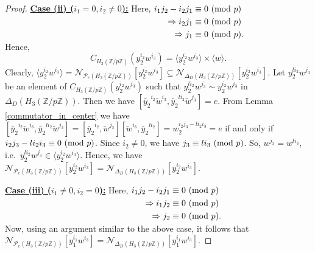 \documentclass[12pt,a4paper]{article}
\begin{document}
\begin{proof}
\vspace{.3cm}
\noindent\underline{\textbf{Case (ii) ($i_1=0, i_2\neq 0$):}} Here, 
$\begin{aligned}[t]
 i_1j_2-i_2j_1&\equiv 0~({\rm mod}~p)\\
 \Rightarrow i_2j_1&\equiv 0~({\rm mod}~p)\\
 \Rightarrow j_1&\equiv 0~({\rm mod}~p).\\
\end{aligned}$\\
Hence, \[C_{H_3(\mathbb{Z}/p\mathbb{Z})}(y_2^{i_2}w^{i_3})=\langle y_2^{i_2}w^{i_3}\rangle\times\langle w\rangle.\] Clearly, $\langle y_2^{i_2}w^{i_3}\rangle=\mathcal{N}_{\mathcal{P}_e(H_3(\mathbb{Z}/p\mathbb{Z}))}[y_2^{i_2}w^{i_3}]\subseteq \mathcal{N}_{\Delta_D(H_3(\mathbb{Z}/p\mathbb{Z}))}[y_2^{i_2}w^{i_3}]$. Let $y_2^{li_2}w^{j_3}$ be an element of $C_{H_3(\mathbb{Z}/p\mathbb{Z})}(y_2^{i_2}w^{i_3})$ such that $y_2^{li_2}w^{j_3}\sim y_2^{i_2}w^{i_3}$ in $\Delta_D(H_3(\mathbb{Z}/p\mathbb{Z}))$. Then we have $[\tilde{y_2}^{i_2}\tilde{w}^{i_3}, \tilde{y_2}^{li_2}\tilde{w}^{j_3}]=e$. From Lemma \ref{commutator_in_center} we have $[\tilde{y_2}^{i_2}\tilde{w}^{i_3}, \tilde{y_2}^{li_2}\tilde{w}^{j_3}]=[\tilde{y_2}^{i_2}, \tilde{w}^{j_3}][\tilde{w}^{i_3}, \tilde{y_2}^{li_2}]=w_2^{i_2j_3-li_2i_3}=e$ if and only if $i_2j_3-li_2i_3\equiv 0~({\rm mod}~p)$. Since $i_2\neq 0$, we have $j_3\equiv li_3~({\rm mod}~p)$. So, $w^{j_3}=w^{li_3}$, i.e.~$y_2^{li_2}w^{j_3}\in \langle y_2^{i_2}w^{i_3}\rangle$. Hence, we have $\mathcal{N}_{\mathcal{P}_e(H_3(\mathbb{Z}/p\mathbb{Z}))}[y_2^{i_2}w^{i_3}]= \mathcal{N}_{\Delta_D(H_3(\mathbb{Z}/p\mathbb{Z}))}[y_2^{i_2}w^{i_3}]$.

\vspace{.3cm}
\noindent\underline{\textbf{Case (iii) ($i_1\neq 0, i_2=0$):}} Here, 
$\begin{aligned}[t]
 i_1j_2-i_2j_1&\equiv 0~({\rm mod}~p)\\
 \Rightarrow i_1j_2&\equiv 0~({\rm mod}~p)\\
 \Rightarrow j_2&\equiv 0~({\rm mod}~p).\\
\end{aligned}$\\
Now, using an argument similar to the above case, it follows that $\mathcal{N}_{\mathcal{P}_e(H_3(\mathbb{Z}/p\mathbb{Z}))}[y_1^{i_1}w^{i_3}]= \mathcal{N}_{\Delta_D(H_3(\mathbb{Z}/p\mathbb{Z}))}[y_1^{i_1}w^{i_3}]$.


\end{proof}
\end{document}
